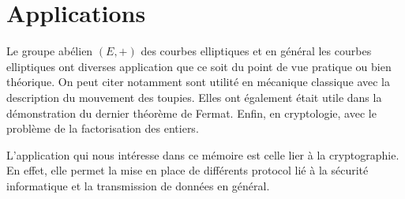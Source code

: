 \chapter{Applications}

Le groupe abélien $(E,+)$ des courbes elliptiques et en général les courbes elliptiques
ont diverses application que ce soit du point de vue pratique ou bien théorique. On peut citer
notamment sont utilité en mécanique classique avec la description du mouvement des
toupies. Elles ont également était utile dans la démonstration du dernier théorème
de Fermat. Enfin, en cryptologie, avec le problème de la factorisation des entiers.

L'application qui nous intéresse dans ce mémoire est celle lier à la cryptographie. En
effet, elle permet la mise en place de différents protocol lié à la sécurité informatique et
la transmission de données en général.
